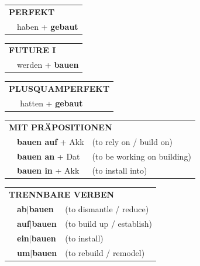 \documentclass[10pt,a4paper]{revtex4-2}
\begin{document}
\begin{verbbox}
    \vspace{10pt}

 \begin{tabular}{rl}
     \multicolumn{2}{l}{\textbf{PERFEKT}}\\
   & haben + \textbf{gebaut}\\
  \end{tabular}
\hfill
   \begin{tabular}{rl}
   
    \multicolumn{2}{l}{\textbf{FUTURE I} }\\
   & werden + \textbf{bauen}\\
 
  \end{tabular}
\hfill
   \begin{tabular}{rl}
      \multicolumn{2}{l}{\textbf{PLUSQUAMPERFEKT}}\\
   & hatten + \textbf{gebaut}\\
  \end{tabular}

   \vspace{10pt}

   \begin{tabular}{lll}
      \multicolumn{3}{l}{\textbf{MIT PRÄPOSITIONEN}}\\
& \textbf{bauen auf} + Akk & (to rely on / build on)\\
& \textbf{bauen an} + Dat & (to be working on building)\\
& \textbf{bauen in} + Akk & (to install into)\\
   \end{tabular}
  \hfill
   \begin{tabular}{lll}
      \multicolumn{3}{l}{\textbf{TRENNBARE VERBEN}}\\
 & \textbf{ab$|$bauen} & (to dismantle / reduce)\\
 & \textbf{auf$|$bauen} & (to build up / establish)\\
 & \textbf{ein$|$bauen} & (to install)\\
 & \textbf{um$|$bauen} & (to rebuild / remodel)
  \end{tabular}

\vspace{-5pt}

\end{verbbox}
\end{document}
